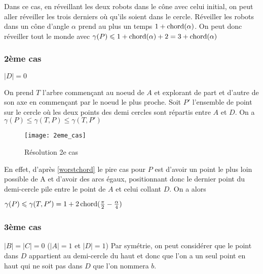 Dans ce cas, en réveillant les deux robots dans le cône avec celui initial, on peut aller réveiller les trois derniers où qu'ils soient dans le cercle. Réveiller les robots dans un cône d'angle $\alpha$ prend au plus un temps $1 + \operatorname{chord}(\alpha)$.
On peut donc réveiller tout le monde avec $\gamma(P) \leqslant 1 + \operatorname{chord}(\alpha) + 2 = 3 + \operatorname{chord}(\alpha)$

\subsubsection*{2ème cas} $|D| = 0$

On prend $T$ l'arbre commençant au noeud de $A$ et explorant de part et d'autre de son axe en commençant par le noeud le plus proche.
Soit $P'$ l'ensemble de point sur le cercle où les deux points des demi cercles sont répartis entre $A$ et $D$.
On a $\gamma(P) \leq  \gamma(T, P) \leq \gamma(T, P')$

\begin{figure}[h!]
  \centering
  \texttt{[image: 2eme\_cas]}
  \caption{Résolution 2e cas}
  \label{fig:2eme_cas}
\end{figure}

En effet, d'après \ref{worstchord} le pire cas pour $P$ est d'avoir un point le plus loin possible de A et d'avoir des arcs égaux, positionnant donc le dernier point du demi-cercle pile entre le point de $A$ et celui collant $D$. On a alors

$\gamma(P) \leqslant \gamma(T, P') = 1 + 2\operatorname{chord}(\frac{\pi}{2} - \frac{\alpha}{4})$

\subsubsection*{3ème cas} $|B| = |C| = 0$ ($|A| = 1$ et $|D| = 1$)
Par symétrie, on peut considérer que le point dans $D$ appartient au demi-cercle du haut et donc que l'on a un seul point en haut qui ne soit pas dans $D$ que l'on nommera $b$.

